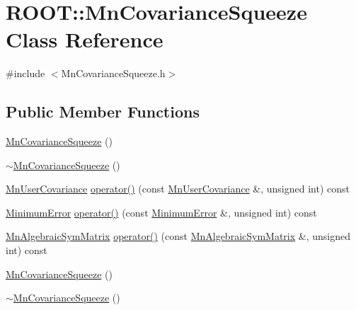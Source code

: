 \hypertarget{classROOT_1_1Minuit2_1_1MnCovarianceSqueeze}{}\section{R\+O\+OT\+:\+:Mn\+Covariance\+Squeeze Class Reference}
\label{classROOT_1_1Minuit2_1_1MnCovarianceSqueeze}


{\ttfamily \#include $<$Mn\+Covariance\+Squeeze.\+h$>$}

\subsection*{Public Member Functions}
\begin{DoxyCompactItemize}
\item 
\mbox{\hyperlink{classROOT_1_1Minuit2_1_1MnCovarianceSqueeze_a865c0aed477be8c5177745181d4cf200}{Mn\+Covariance\+Squeeze}} ()
\item 
\mbox{\hyperlink{classROOT_1_1Minuit2_1_1MnCovarianceSqueeze_a15e84b50e1ac75701a986f62e74d77d6}{$\sim$\+Mn\+Covariance\+Squeeze}} ()
\item 
\mbox{\hyperlink{classROOT_1_1Minuit2_1_1MnUserCovariance}{Mn\+User\+Covariance}} \mbox{\hyperlink{classROOT_1_1Minuit2_1_1MnCovarianceSqueeze_af75da2b8e6e20a5477a6b0ceac4efb3a}{operator()}} (const \mbox{\hyperlink{classROOT_1_1Minuit2_1_1MnUserCovariance}{Mn\+User\+Covariance}} \&, unsigned int) const
\item 
\mbox{\hyperlink{classROOT_1_1Minuit2_1_1MinimumError}{Minimum\+Error}} \mbox{\hyperlink{classROOT_1_1Minuit2_1_1MnCovarianceSqueeze_a6f1ea9726d0981faacf7ee0c26326bcd}{operator()}} (const \mbox{\hyperlink{classROOT_1_1Minuit2_1_1MinimumError}{Minimum\+Error}} \&, unsigned int) const
\item 
\mbox{\hyperlink{namespaceROOT_1_1Minuit2_a9e74ad97f5537a2e80e52b04d98ecc6e}{Mn\+Algebraic\+Sym\+Matrix}} \mbox{\hyperlink{classROOT_1_1Minuit2_1_1MnCovarianceSqueeze_a3271676361fc2c88dad2037f40479fab}{operator()}} (const \mbox{\hyperlink{namespaceROOT_1_1Minuit2_a9e74ad97f5537a2e80e52b04d98ecc6e}{Mn\+Algebraic\+Sym\+Matrix}} \&, unsigned int) const
\item 
\mbox{\hyperlink{classROOT_1_1Minuit2_1_1MnCovarianceSqueeze_a865c0aed477be8c5177745181d4cf200}{Mn\+Covariance\+Squeeze}} ()
\item 
\mbox{\hyperlink{classROOT_1_1Minuit2_1_1MnCovarianceSqueeze_a15e84b50e1ac75701a986f62e74d77d6}{$\sim$\+Mn\+Covariance\+Squeeze}} ()

\end{DoxyCompactItemize}
